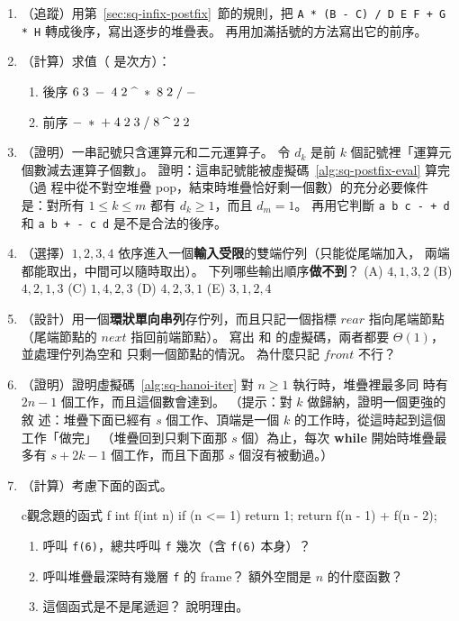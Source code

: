 \begin{enumerate}
\item （追蹤）用第~\ref{sec:sq-infix-postfix}~節的規則，把
\texttt{A * (B - C) / D \sqpow{} E \sqpow{} F + G * H} 轉成後序，寫出逐步的堆疊表。
再用加滿括號的方法寫出它的前序。

\item （計算）求值（\sqpow{} 是次方）：
\begin{enumerate}
\item 後序 $6\;3\;-\;4\;2\;\text{\textasciicircum}\;*\;8\;2\;/\;-$
\item 前序 $-\;*\;+\;4\;2\;3\;/\;8\;\text{\textasciicircum}\;2\;2$
\end{enumerate}

\item （證明）一串記號只含運算元和二元運算子。 令 $d_k$ 是前 $k$ 個記號裡「運算元
個數減去運算子個數」。 證明：這串記號能被虛擬碼~\ref{alg:sq-postfix-eval} 算完（過
程中從不對空堆疊 pop，結束時堆疊恰好剩一個數）的充分必要條件是：對所有
$1 \le k \le m$ 都有 $d_k \ge 1$，而且 $d_m = 1$。 再用它判斷 \texttt{a b c - + d}
和 \texttt{a b + - c d} 是不是合法的後序。

\item \label{q:sq-deque}（選擇）$1, 2, 3, 4$ 依序進入一個\textbf{輸入受限}的雙端佇列（只能從尾端加入，
兩端都能取出，中間可以隨時取出）。 下列哪些輸出順序\textbf{做不到}？
(A) $4, 1, 3, 2$ \quad (B) $4, 2, 1, 3$ \quad (C) $1, 4, 2, 3$ \quad
(D) $4, 2, 3, 1$ \quad (E) $3, 1, 2, 4$

\item （設計）用一個\textbf{環狀單向串列}存佇列，而且只記一個指標
$\mathit{rear}$ 指向尾端節點（尾端節點的 $\mathit{next}$ 指回前端節點）。 寫出
 和  的虛擬碼，兩者都要 $\Theta(1)$，並處理佇列為空和
只剩一個節點的情況。 為什麼只記 $\mathit{front}$ 不行？

\item \label{q:sq-hanoi-depth}（證明）證明虛擬碼~\ref{alg:sq-hanoi-iter} 對 $n \ge 1$ 執行時，堆疊裡最多同
時有 $2n - 1$ 個工作，而且這個數會達到。 （提示：對 $k$ 做歸納，證明一個更強的敘
述：堆疊下面已經有 $s$ 個工作、頂端是一個 $k$ 的工作時，從這時起到這個工作「做完」
（堆疊回到只剩下面那 $s$ 個）為止，每次 \textbf{while} 開始時堆疊最多有
$s + 2k - 1$ 個工作，而且下面那 $s$ 個沒有被動過。）

\item \label{q:sq-fib}（計算）考慮下面的函式。
\begin{code}{c}{觀念題的函式 f}
int f(int n)
{
    if (n <= 1)
        return 1;
    return f(n - 1) + f(n - 2);
}
\end{code}
\begin{enumerate}
\item 呼叫 \texttt{f(6)}，總共呼叫 \texttt{f} 幾次（含 \texttt{f(6)} 本身）？
\item 呼叫堆疊最深時有幾層 \texttt{f} 的 frame？ 額外空間是 $n$ 的什麼函數？
\item 這個函式是不是尾遞迴？ 說明理由。
\end{enumerate}


\end{enumerate}
